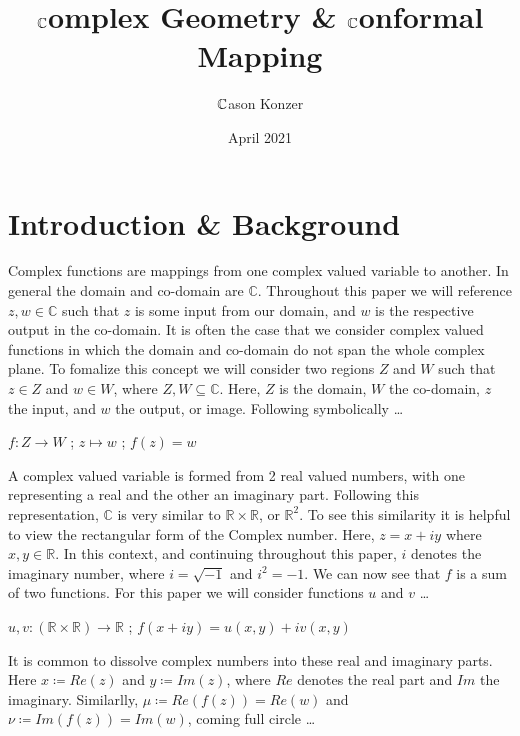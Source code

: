 \documentclass[a4paper,man,natbib]{apa6}
\title{$ \C $omplex Geometry \& $ \C $onformal Mapping}
\author{ $\C $ason Konzer}
\date{April 2021}
\affiliation{University of Michigan}
\newcommand{\C}{\mathbb{C}}  %
\newcommand{\R}{\mathbb{R}}  %
\begin{document}
\maketitle

\section{Introduction \& Background}
\label{sec: Before we Start}

Complex functions are mappings from one complex valued variable to another. In general the domain and co-domain are $ \C $.
Throughout this paper we will reference $ z,w \in \C $ such that $ z $ is some input from our domain, and $ w $ is the respective output in the co-domain. 
It is often the case that we consider complex valued functions in which the domain and co-domain do not span the whole complex plane. 
To fomalize this concept we will consider two regions $ Z $ and $ W $ such that $ z \in Z $ and $ w \in W $, where $ Z,W \subseteq \C $. 
Here, $ Z $ is the domain, $ W $ the co-domain, $ z $ the input, and $ w $ the output, or image. Following symbolically \dots

\begin{center}

      $ f: Z \to W $ ; $ z \mapsto w $ ; $ f(z) = w $ 

\end{center}



A complex valued variable is formed from 2 real valued numbers, with one representing a real and the other an imaginary part.
Following this representation, $ \C $ is very similar to $ \R \times \R $, or $ \R^2 $.  
To see this similarity it is helpful to view the rectangular form of the Complex number. Here, $z = x + iy$ where $x,y \in \R$. 
In this context, and continuing throughout this paper, $ i $ denotes the imaginary number, where $ i = \sqrt{-1} $ and $ i^2 = -1 $.
We can now see that $ f $ is a sum of two functions. For this paper we will consider functions $u$ and $v$ \dots

\begin{center}

      $ u,v: (\R \times \R) \to \R $ ; $ f(x+iy) = u(x,y) + iv(x,y) $ 

\end{center}

It is common to dissolve complex numbers into these real and imaginary parts. Here $ x \coloneqq Re(z) $ and $ y \coloneqq Im(z) $, where $ Re $ denotes the real part and $ Im $ the imaginary.
Similarlly, $ \mu \coloneqq Re(f(z)) = Re(w) $ and $ \nu \coloneqq Im(f(z)) = Im(w) $, coming full circle \dots
\end{document}

